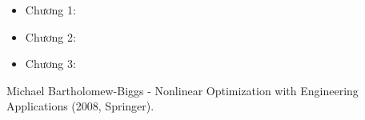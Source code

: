 \documentclass[12pt,a4paper]{report}
\numberwithin{equation}{section}
\theoremstyle{definition} %
\begin{document}
	\begin{itemize}
	\item Chương 1:
	

	
	\item Chương 2:

	
	\item Chương 3: 
	

	
	\end{itemize}
	
	\begin{thebibliography}{99}
		\thispagestyle{fancy}
		
		
		
		

		
		 Michael Bartholomew-Biggs - Nonlinear Optimization with Engineering Applications (2008, Springer).
		
		
		
		
		
		
		
		
	\end{thebibliography}
	
	\newpage %
	
	\thispagestyle{empty} %

	\mbox{}
\end{document}
